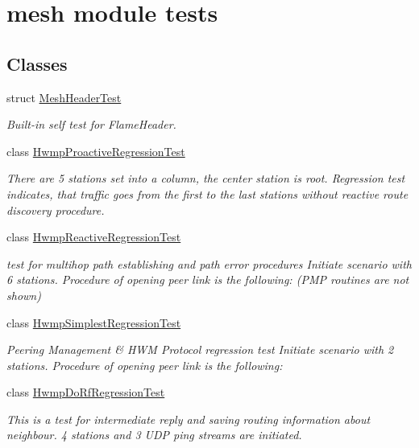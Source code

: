 \hypertarget{group__dot11s-test}{}\section{mesh module tests}
\label{group__dot11s-test}
\subsection*{Classes}
\begin{DoxyCompactItemize}
\item 
struct \hyperlink{structMeshHeaderTest}{Mesh\+Header\+Test}
\begin{DoxyCompactList}\small\item\em Built-\/in self test for Flame\+Header. \end{DoxyCompactList}\item 
class \hyperlink{classHwmpProactiveRegressionTest}{Hwmp\+Proactive\+Regression\+Test}
\begin{DoxyCompactList}\small\item\em There are 5 stations set into a column, the center station is root. Regression test indicates, that traffic goes from the first to the last stations without reactive route discovery procedure. \end{DoxyCompactList}\item 
class \hyperlink{classHwmpReactiveRegressionTest}{Hwmp\+Reactive\+Regression\+Test}
\begin{DoxyCompactList}\small\item\em test for multihop path establishing and path error procedures Initiate scenario with 6 stations. Procedure of opening peer link is the following\+: (P\+MP routines are not shown) \end{DoxyCompactList}\item 
class \hyperlink{classHwmpSimplestRegressionTest}{Hwmp\+Simplest\+Regression\+Test}
\begin{DoxyCompactList}\small\item\em Peering Management \& H\+WM Protocol regression test Initiate scenario with 2 stations. Procedure of opening peer link is the following\+: \end{DoxyCompactList}\item 
class \hyperlink{classHwmpDoRfRegressionTest}{Hwmp\+Do\+Rf\+Regression\+Test}
\begin{DoxyCompactList}\small\item\em This is a test for intermediate reply and saving routing information about neighbour. 4 stations and 3 U\+DP ping streams are initiated. \end{DoxyCompactList}\item 

\end{DoxyCompactItemize}
